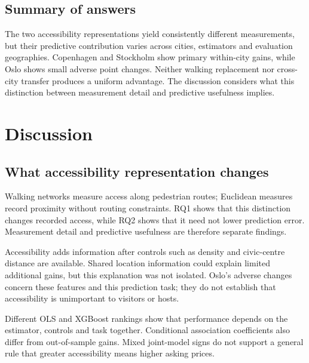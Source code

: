 \documentclass[11pt,a4paper,oneside,openany]{memoir}
\begin{document}
\section{Summary of answers}
\label{sec:results-summary}
The two accessibility representations yield consistently different
measurements, but their predictive contribution varies across cities,
estimators and evaluation geographies. Copenhagen and Stockholm show primary
within-city gains, while Oslo shows small adverse point changes. Neither
walking replacement nor cross-city transfer produces a uniform advantage.
The discussion considers what this distinction between measurement detail
and predictive usefulness implies.

\chapter{Discussion}
\label{ch:discussion}

\section{What accessibility representation changes}
\label{sec:discussion-measurement}
Walking networks measure access along pedestrian routes; Euclidean measures
record proximity without routing constraints. RQ1 shows that this distinction
changes recorded access, while RQ2 shows that it need not lower prediction error.
Measurement detail and predictive usefulness are therefore separate findings.

Accessibility adds information after controls such as density and civic-centre
distance are available. Shared location information could explain limited
additional gains, but this explanation was not isolated. Oslo's adverse changes
concern these features and this prediction task; they do not establish that
accessibility is unimportant to visitors or hosts.

Different OLS and XGBoost rankings show that performance depends on the
estimator, controls and task together. Conditional association coefficients
also differ from out-of-sample gains. Mixed joint-model signs do not support
a general rule that greater accessibility means higher asking prices.
\end{document}
